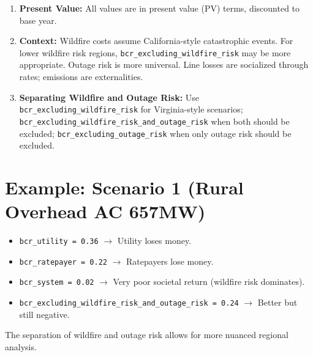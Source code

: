 \documentclass[ctcc_full_documentation.tex]{subfiles}
\begin{document}
\begin{enumerate}
\item \textbf{Present Value:} All values are in present value (PV) terms, discounted to base year.
\item \textbf{Context:} Wildfire costs assume California-style catastrophic events. For lower wildfire risk regions, \texttt{bcr\_excluding\_wildfire\_risk} may be more appropriate. Outage risk is more universal. Line losses are socialized through rates; emissions are externalities.
\item \textbf{Separating Wildfire and Outage Risk:} Use \texttt{bcr\_excluding\_wildfire\_risk} for Virginia-style scenarios; \texttt{bcr\_excluding\_wildfire\_risk\_and\_outage\_risk} when both should be excluded; \texttt{bcr\_excluding\_outage\_risk} when only outage risk should be excluded.
\end{enumerate}

\section{Example: Scenario 1 (Rural Overhead AC 657MW)}

\begin{itemize}
\item \texttt{bcr\_utility = 0.36} $\to$ Utility loses money.
\item \texttt{bcr\_ratepayer = 0.22} $\to$ Ratepayers lose money.
\item \texttt{bcr\_system = 0.02} $\to$ Very poor societal return (wildfire risk dominates).
\item \texttt{bcr\_excluding\_wildfire\_risk\_and\_outage\_risk = 0.24} $\to$ Better but still negative.
\end{itemize}

The separation of wildfire and outage risk allows for more nuanced regional analysis.
\end{document}
